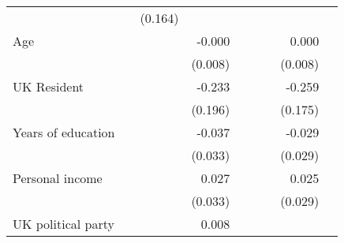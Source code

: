 \documentclass{article}
\begin{document}
\begin{table}[!h]
\begin{tabular}{lllllllll}
  \multicolumn{1}{r}{} &
  \multicolumn{1}{l}{} &
  \multicolumn{1}{r}{(0.164)} &
  \multicolumn{1}{l}{} \\
\multicolumn{1}{l}{Age} &
  \multicolumn{1}{r}{} &
  \multicolumn{1}{l}{} &
  \multicolumn{1}{r}{-0.000} &
  \multicolumn{1}{l}{} &
  \multicolumn{1}{r}{} &
  \multicolumn{1}{l}{} &
  \multicolumn{1}{r}{0.000} &
  \multicolumn{1}{l}{} \\
\multicolumn{1}{l}{} &
  \multicolumn{1}{r}{} &
  \multicolumn{1}{l}{} &
  \multicolumn{1}{r}{(0.008)} &
  \multicolumn{1}{l}{} &
  \multicolumn{1}{r}{} &
  \multicolumn{1}{l}{} &
  \multicolumn{1}{r}{(0.008)} &
  \multicolumn{1}{l}{} \\
\multicolumn{1}{l}{UK Resident} &
  \multicolumn{1}{r}{} &
  \multicolumn{1}{l}{} &
  \multicolumn{1}{r}{-0.233} &
  \multicolumn{1}{l}{} &
  \multicolumn{1}{r}{} &
  \multicolumn{1}{l}{} &
  \multicolumn{1}{r}{-0.259} &
  \multicolumn{1}{l}{} \\
\multicolumn{1}{l}{} &
  \multicolumn{1}{r}{} &
  \multicolumn{1}{l}{} &
  \multicolumn{1}{r}{(0.196)} &
  \multicolumn{1}{l}{} &
  \multicolumn{1}{r}{} &
  \multicolumn{1}{l}{} &
  \multicolumn{1}{r}{(0.175)} &
  \multicolumn{1}{l}{} \\
\multicolumn{1}{l}{Years of education} &
  \multicolumn{1}{r}{} &
  \multicolumn{1}{l}{} &
  \multicolumn{1}{r}{-0.037} &
  \multicolumn{1}{l}{} &
  \multicolumn{1}{r}{} &
  \multicolumn{1}{l}{} &
  \multicolumn{1}{r}{-0.029} &
  \multicolumn{1}{l}{} \\
\multicolumn{1}{l}{} &
  \multicolumn{1}{r}{} &
  \multicolumn{1}{l}{} &
  \multicolumn{1}{r}{(0.033)} &
  \multicolumn{1}{l}{} &
  \multicolumn{1}{r}{} &
  \multicolumn{1}{l}{} &
  \multicolumn{1}{r}{(0.029)} &
  \multicolumn{1}{l}{} \\
\multicolumn{1}{l}{Personal income} &
  \multicolumn{1}{r}{} &
  \multicolumn{1}{l}{} &
  \multicolumn{1}{r}{0.027} &
  \multicolumn{1}{l}{} &
  \multicolumn{1}{r}{} &
  \multicolumn{1}{l}{} &
  \multicolumn{1}{r}{0.025} &
  \multicolumn{1}{l}{} \\
\multicolumn{1}{l}{} &
  \multicolumn{1}{r}{} &
  \multicolumn{1}{l}{} &
  \multicolumn{1}{r}{(0.033)} &
  \multicolumn{1}{l}{} &
  \multicolumn{1}{r}{} &
  \multicolumn{1}{l}{} &
  \multicolumn{1}{r}{(0.029)} &
  \multicolumn{1}{l}{} \\
\multicolumn{1}{l}{UK political party} &
  \multicolumn{1}{r}{} &
  \multicolumn{1}{l}{} &
  \multicolumn{1}{r}{0.008} &
  \multicolumn{1}{l}{} &
  \multicolumn{1}{r}{} &
  \multicolumn{1}{l}{} &

\end{tabular}
\end{table}
\end{document}
